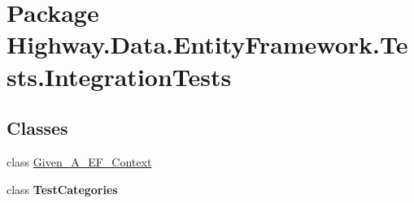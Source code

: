 \hypertarget{namespace_highway_1_1_data_1_1_entity_framework_1_1_tests_1_1_integration_tests}{\section{Package Highway.\-Data.\-Entity\-Framework.\-Tests.\-Integration\-Tests}
\label{namespace_highway_1_1_data_1_1_entity_framework_1_1_tests_1_1_integration_tests}
}
\subsection*{Classes}
\begin{DoxyCompactItemize}
\item 
class \hyperlink{class_highway_1_1_data_1_1_entity_framework_1_1_tests_1_1_integration_tests_1_1_given___a___e_f___context}{Given\-\_\-\-A\-\_\-\-E\-F\-\_\-\-Context}
\item 
class {\bfseries Test\-Categories}
\end{DoxyCompactItemize}
